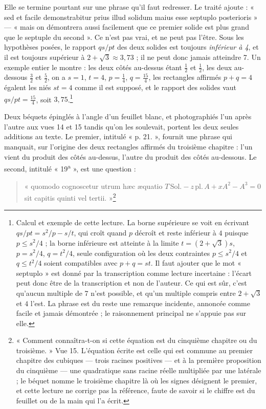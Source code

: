 \documentclass[11pt,a4paper]{article}
\begin{document}
Elle se termine pourtant sur une phrase qu'il faut redresser. Le traité ajoute :
« sed et facile demonstrabitur prius illud solidum maius esse septuplo
posterioris » — « mais on démontrera aussi facilement que ce premier solide est
plus grand que le septuple du second ». Ce n'est pas vrai, et ne peut pas
l'être. Sous les hypothèses posées, le rapport $qs/pt$ des deux solides est
toujours \emph{inférieur à 4}, et il est toujours supérieur à $2+\sqrt3 \approx
3{,}73$ ; il ne peut donc jamais atteindre 7. Un exemple entier le montre : les
deux côtés au-dessus étant $\tfrac12$ et $\tfrac12$, les deux au-dessous
$\tfrac32$ et $\tfrac52$, on a $s = 1$, $t = 4$, $p = \tfrac14$, $q = \tfrac{15}4$,
les rectangles affirmés $p + q = 4$ égalent les niés $st = 4$ comme il est
supposé, et le rapport des solides vaut $qs/pt = \tfrac{15}{4}$, soit
$3{,}75$.\footnote{Calcul et exemple de cette lecture. La borne supérieure se
voit en écrivant $qs/pt = s^2/p - s/t$, qui croît quand $p$ décroît et reste
inférieur à $4$ puisque $p \le s^2/4$ ; la borne inférieure est atteinte à la
limite $t = (2+\sqrt3)s$, $p = s^2/4$, $q = t^2/4$, seule configuration où les
deux contraintes $p \le s^2/4$ et $q \le t^2/4$ soient compatibles avec
$p + q = st$. Il faut ajouter que le mot « septuplo » est donné par la
transcription comme lecture incertaine : l'écart peut donc être de la
transcription et non de l'auteur. Ce qui est sûr, c'est qu'aucun multiple de 7
n'est possible, et qu'un multiple compris entre $2+\sqrt3$ et $4$ l'est. La
phrase est du reste une remarque incidente, annoncée comme facile et jamais
démontrée ; le raisonnement principal ne s'appuie pas sur elle.}

Deux béquets épinglés à l'angle d'un feuillet blanc, et photographiés l'un après
l'autre aux vues 14 et 15 tandis qu'on les soulevait, portent les deux seules
additions au texte. Le premier, intitulé « p. 21. », fournit une phrase qui
manquait, sur l'origine des deux rectangles affirmés du troisième chapitre : l'un
vient du produit des côtés au-dessus, l'autre du produit des côtés au-dessous.
Le second, intitulé « 19\textsuperscript{a} », est une question :

\begin{quote}
« quomodo cognoscetur utrum hæc æquatio $T\,\mathrm{Sol.} - z\,\mathrm{pl.}\,A +
xA^2 - A^3 = 0$ sit capitis quinti vel tertii. »\footnote{« Comment
connaîtra-t-on si cette équation est du cinquième chapitre ou du troisième. »
Vue 15. L'équation écrite est celle qui est commune au premier chapitre des
cubiques — trois racines positives — et à la première proposition du cinquième —
une quadratique sans racine réelle multipliée par une latérale ; le béquet nomme
le troisième chapitre là où les signes désignent le premier, et cette lecture ne
corrige pas la référence, faute de savoir si le chiffre est du feuillet ou de la
main qui l'a écrit.}
\end{quote}
\end{document}
